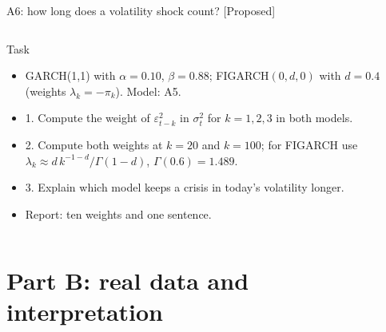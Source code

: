 \begin{frame}{A6: how long does a volatility shock count? [Proposed]}
\propsub
\itemsize{\scriptsize}
\begin{columns}[T]
\begin{column}{\taskw}
\begin{block}{Task}
\begin{itemize}
    \item GARCH(1,1) with $\alpha = 0.10$, $\beta = 0.88$; FIGARCH$(0, d, 0)$ with $d = 0.4$ (weights $\lambda_k = -\pi_k$). Model: A5.
    \item 1. Compute the weight of $\varepsilon_{t-k}^2$ in $\sigma_t^2$ for $k = 1, 2, 3$ in both models.
    \item 2. Compute both weights at $k = 20$ and $k = 100$; for FIGARCH use $\lambda_k \approx d\,k^{-1-d}/\Gamma(1-d)$, $\Gamma(0.6) = 1.489$.
    \item 3. Explain which model keeps a crisis in today's volatility longer.
    \item Report: ten weights and one sentence.
\end{itemize}
\end{block}
\end{column}
\begin{column}{\solw}
\end{column}
\end{columns}
\end{frame}


\section{Part B: real data and interpretation}

